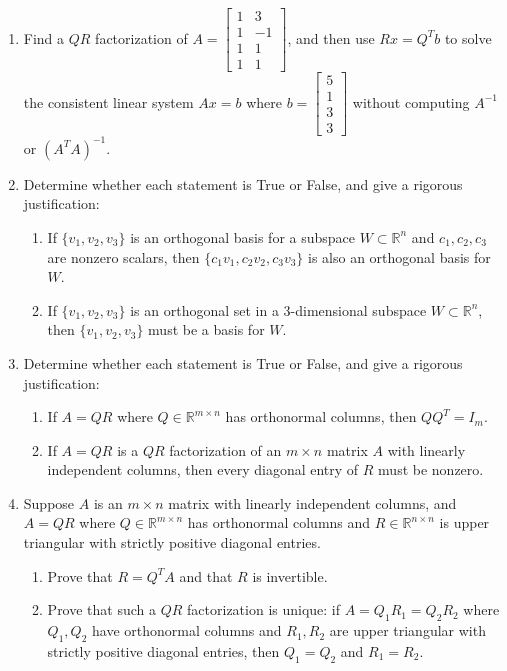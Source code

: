 \documentclass[11pt, letterpaper]{article}
\theoremstyle{definition}
\theoremstyle{remark}
\begin{document}
\begin{enumerate}[label=\textbf{Problem \arabic*.}, leftmargin=*, itemsep=0.9em]
    \item Find a $QR$ factorization of $A = \begin{bmatrix} 1 & 3 \\ 1 & -1 \\ 1 & 1 \\ 1 & 1 \end{bmatrix}$, and then use $Rx = Q^T b$ to solve the consistent linear system $Ax = b$ where $b = \begin{bmatrix} 5 \\ 1 \\ 3 \\ 3 \end{bmatrix}$ without computing $A^{-1}$ or $(A^T A)^{-1}$.

    \item Determine whether each statement is True or False, and give a rigorous justification:
    \begin{enumerate}[label=(\alph*)]
        \item If $\{v_1, v_2, v_3\}$ is an orthogonal basis for a subspace $W \subset \mathbb{R}^n$ and $c_1, c_2, c_3$ are nonzero scalars, then $\{c_1 v_1, c_2 v_2, c_3 v_3\}$ is also an orthogonal basis for $W$.
        \item If $\{v_1, v_2, v_3\}$ is an orthogonal set in a $3$-dimensional subspace $W \subset \mathbb{R}^n$, then $\{v_1, v_2, v_3\}$ must be a basis for $W$.
    \end{enumerate}

    \item Determine whether each statement is True or False, and give a rigorous justification:
    \begin{enumerate}[label=(\alph*)]
        \item If $A = QR$ where $Q \in \mathbb{R}^{m \times n}$ has orthonormal columns, then $Q Q^T = I_m$.
        \item If $A = QR$ is a $QR$ factorization of an $m \times n$ matrix $A$ with linearly independent columns, then every diagonal entry of $R$ must be nonzero.
    \end{enumerate}

    \item Suppose $A$ is an $m \times n$ matrix with linearly independent columns, and $A = QR$ where $Q \in \mathbb{R}^{m \times n}$ has orthonormal columns and $R \in \mathbb{R}^{n \times n}$ is upper triangular with strictly positive diagonal entries.
    \begin{enumerate}[label=(\alph*)]
        \item Prove that $R = Q^T A$ and that $R$ is invertible.
        \item Prove that such a $QR$ factorization is unique: if $A = Q_1 R_1 = Q_2 R_2$ where $Q_1, Q_2$ have orthonormal columns and $R_1, R_2$ are upper triangular with strictly positive diagonal entries, then $Q_1 = Q_2$ and $R_1 = R_2$.
    \end{enumerate}


\end{enumerate}
\end{document}
